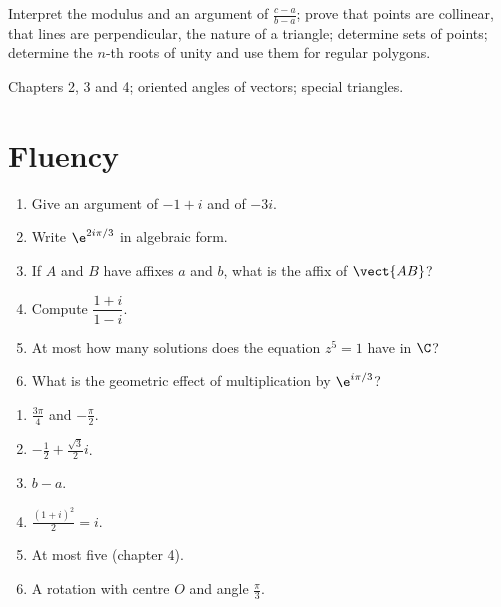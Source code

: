 
\begin{objectives}
Interpret the modulus and an argument of $\frac{c-a}{b-a}$; prove that points are collinear, that lines are perpendicular, the nature of a triangle; determine sets of points; determine the $n$-th roots of unity and use them for regular polygons.
\end{objectives}
\begin{prerequisites}
Chapters 2, 3 and 4; oriented angles of vectors; special triangles.
\end{prerequisites}

\section{Fluency}
\begin{fluency}
\begin{enumerate}
\item Give an argument of $-1+i$ and of $-3i$.
\item Write $\e^{2i\pi/3}$ in algebraic form.
\item If $A$ and $B$ have affixes $a$ and $b$, what is the affix of $\vect{AB}$?
\item Compute $\dfrac{1+i}{1-i}$.
\item At most how many solutions does the equation $z^5=1$ have in $\C$?
\item What is the geometric effect of multiplication by $\e^{i\pi/3}$?
\end{enumerate}
\end{fluency}
\begin{solution}[Fluency]
\begin{enumerate}
\item $\frac{3\pi}4$ and $-\frac\pi2$.
\item $-\frac12+\frac{\sqrt3}2i$.
\item $b-a$.
\item $\frac{(1+i)^2}{2}=i$.
\item At most five (chapter 4).
\item A rotation with centre $O$ and angle $\frac\pi3$.
\end{enumerate}
\end{solution}

\mxnewpage
